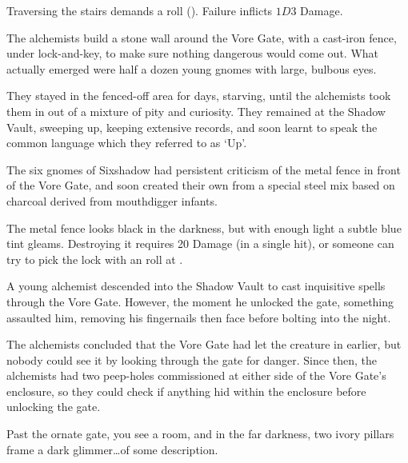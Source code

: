 \begin{multicols}{2}
Traversing the stairs demands a  roll (\tn[8]).
Failure inflicts $1D3$ Damage.



\begin{exampletext}
  The alchemists build a stone wall around the Vore Gate, with a cast-iron fence, under lock-and-key, to make sure nothing dangerous would come out.
  What actually emerged were half a dozen young gnomes with large, bulbous eyes.

  They stayed in the fenced-off area for days, starving, until the alchemists took them in out of a mixture of pity and curiosity.
  They remained at the Shadow Vault, sweeping up, keeping extensive records, and soon learnt to speak the common language which they referred to as `Up'.

  The six gnomes of Sixshadow had persistent criticism of the metal fence in front of the Vore Gate, and soon created their own from a special steel mix based on charcoal derived from mouthdigger infants.
\end{exampletext}

The metal fence looks black in the darkness, but with enough light a subtle blue tint gleams.
Destroying it requires 20 Damage (in a single hit), or someone can try to pick the lock with an  roll at \tn[16].

\shadowVaultMap


\begin{exampletext}
  A young alchemist descended into the Shadow Vault to cast inquisitive spells through the Vore Gate.
  However, the moment he unlocked the gate, something assaulted him, removing his fingernails then face before bolting into the night.

  The alchemists concluded that the Vore Gate had let the creature in earlier, but nobody could see it by looking through the gate for danger.
  Since then, the alchemists had two peep-holes commissioned at either side of the Vore Gate's enclosure, so they could check if anything hid within the enclosure before unlocking the gate.
\end{exampletext}

\begin{boxtext}
  Past the ornate gate, you see a room, and in the far darkness, two ivory pillars frame a dark glimmer\ldots of some description.
\end{boxtext}


\end{multicols}
